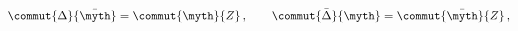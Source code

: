\begin{equation}
\commut{\Delta}{\bar\myth}=\commut{\myth}{Z}\,,\qquad
\commut{\bar\Delta}{\myth}=\commut{\bar\myth}{Z}\,,
\end{equation}

